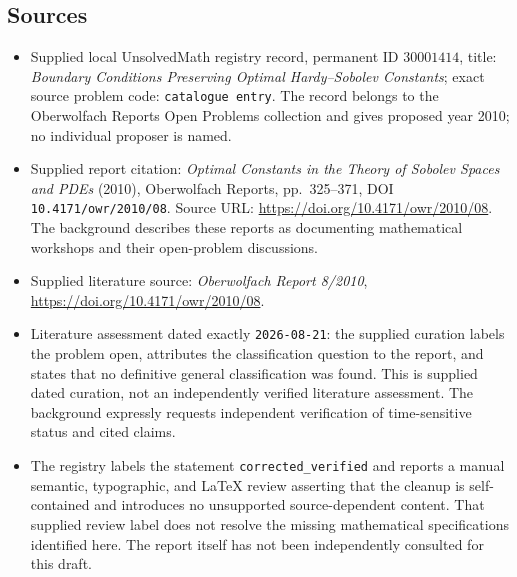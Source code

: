 \documentclass[11pt]{article}
\begin{document}
\subsection{Sources}
\begin{itemize}
\item Supplied local UnsolvedMath registry record, permanent ID \(30001414\), title: \emph{Boundary Conditions Preserving Optimal Hardy--Sobolev Constants}; exact source problem code: \texttt{catalogue entry}. The record belongs to the Oberwolfach Reports Open Problems collection and gives proposed year 2010; no individual proposer is named.
\item Supplied report citation: \emph{Optimal Constants in the Theory of Sobolev Spaces and PDEs} (2010), Oberwolfach Reports, pp.~325--371, DOI \texttt{10.4171/owr/2010/08}. Source URL: \url{https://doi.org/10.4171/owr/2010/08}. The background describes these reports as documenting mathematical workshops and their open-problem discussions.
\item Supplied literature source: \emph{Oberwolfach Report 8/2010}, \url{https://doi.org/10.4171/owr/2010/08}.
\item Literature assessment dated exactly \texttt{2026-08-21}: the supplied curation labels the problem open, attributes the classification question to the report, and states that no definitive general classification was found. This is supplied dated curation, not an independently verified literature assessment. The background expressly requests independent verification of time-sensitive status and cited claims.
\item The registry labels the statement \texttt{corrected\_verified} and reports a manual semantic, typographic, and LaTeX review asserting that the cleanup is self-contained and introduces no unsupported source-dependent content. That supplied review label does not resolve the missing mathematical specifications identified here. The report itself has not been independently consulted for this draft.
\end{itemize}
\end{document}
